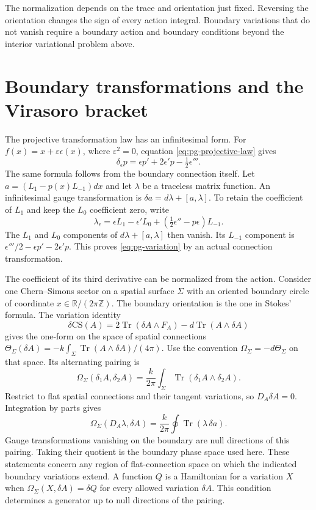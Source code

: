 The normalization depends on the trace and orientation just fixed.
Reversing the orientation changes the sign of every action integral.
Boundary variations that do not vanish require a boundary action and boundary conditions beyond the interior variational problem above.

\section{Boundary transformations and the Virasoro bracket}

The projective transformation law has an infinitesimal form.
For $f(x)=x+\varepsilon\epsilon(x)$, where $\varepsilon^2=0$, equation
\eqref{eq:pg-projective-law} gives
\begin{equation}\label{eq:pg-variation}
 \delta_\epsilon p=\epsilon p'+2\epsilon'p-\tfrac12\epsilon'''.
\end{equation}
The same formula follows from the boundary connection itself.
Let $a=(L_1-p(x)L_{-1})dx$ and let $\lambda$ be a traceless matrix function.
An infinitesimal gauge transformation is $\delta a=d\lambda+[a,\lambda]$.
To retain the coefficient of $L_1$ and keep the $L_0$ coefficient zero, write
\[
 \lambda_\epsilon
 =\epsilon L_1-\epsilon'L_0+(\tfrac12\epsilon''-p\epsilon)L_{-1}.
\]
The $L_1$ and $L_0$ components of $d\lambda+[a,\lambda]$ then vanish.
Its $L_{-1}$ component is $\epsilon'''/2-\epsilon p'-2\epsilon'p$.
This proves \eqref{eq:pg-variation} by an actual connection transformation.

The coefficient of its third derivative can be normalized from the action.
Consider one Chern--Simons sector on a spatial surface $\Sigma$ with an oriented boundary circle of coordinate $x\in\mathbb R/(2\pi\mathbb Z)$.
The boundary orientation is the one in Stokes' formula.
The variation identity
\[
 \delta\mathrm{CS}(A)=2\operatorname{Tr}(\delta A\wedge F_A)
                      -d\operatorname{Tr}(A\wedge\delta A)
\]
gives the one-form on the space of spatial connections
$\Theta_\Sigma(\delta A)=-k\int_\Sigma\operatorname{Tr}(A\wedge\delta A)/(4\pi)$.
Use the convention $\Omega_\Sigma=-d\Theta_\Sigma$ on that space.
Its alternating pairing is
\[
 \Omega_\Sigma(\delta_1A,\delta_2A)
   =\frac{k}{2\pi}\int_\Sigma\operatorname{Tr}(\delta_1A\wedge\delta_2A).
\]
Restrict to flat spatial connections and their tangent variations, so $D_A\delta A=0$.
Integration by parts gives
\begin{equation}\label{eq:pg-boundary-hamiltonian}
 \Omega_\Sigma(D_A\lambda,\delta A)
 =\frac{k}{2\pi}\oint\operatorname{Tr}(\lambda\,\delta a).
\end{equation}
Gauge transformations vanishing on the boundary are null directions of this pairing.
Taking their quotient is the boundary phase space used here.
These statements concern any region of flat-connection space on which the indicated boundary variations extend.
A function $Q$ is a Hamiltonian for a variation $X$ when $\Omega_\Sigma(X,\delta A)=\delta Q$ for every allowed variation $\delta A$.
This condition determines a generator up to null directions of the pairing.

